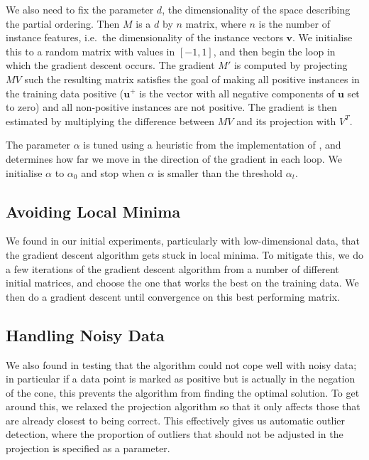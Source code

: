 We also need to fix the parameter $d$, the dimensionality of the space
describing the partial ordering. Then $M$ is a $d$ by $n$ matrix,
where $n$ is the number of instance features, i.e.~the dimensionality
of the instance vectors $\mathbf{v}$. We initialise this to a random
matrix with values in $[-1,1]$, and then begin the loop in which the
gradient descent occurs. The gradient $M'$ is computed by projecting
$MV$ such the resulting matrix satisfies the goal of making all
positive instances in the training data positive ($\mathbf{u}^+$ is
the vector with all negative components of $\mathbf{u}$ set to zero)
and all non-positive instances are not positive. The gradient is then
estimated by multiplying the difference between $MV$ and its
projection with $V^T$.

The parameter $\alpha$ is tuned using a heuristic from the
implementation of , and determines how far we move
in the direction of the gradient in each loop. We initialise $\alpha$
to $\alpha_0$ and stop when $\alpha$ is smaller than the threshold
$\alpha_t$.

\subsection{Avoiding Local Minima}

We found in our initial experiments, particularly with low-dimensional
data, that the gradient descent algorithm gets stuck in local
minima. To mitigate this, we do a few iterations of the gradient
descent algorithm from a number of different initial matrices, and
choose the one that works the best on the training data. We then do a
gradient descent until convergence on this best performing matrix.

\subsection{Handling Noisy Data}

We also found in testing that the algorithm could not cope well with
noisy data; in particular if a data point is marked as positive but is
actually in the negation of the cone, this prevents the algorithm from
finding the optimal solution. To get around this, we relaxed the
projection algorithm so that it only affects those that are already
closest to being correct. This effectively gives us automatic outlier
detection, where the proportion of outliers that should not be
adjusted in the projection is specified as a parameter.

